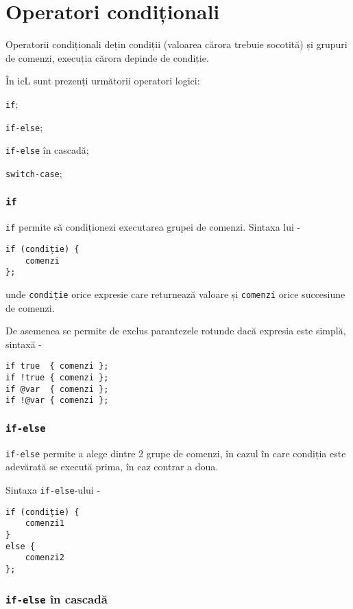 \section{Operatori condiționali}

Operatorii condiționali dețin condiții (valoarea cărora trebuie socotită) și grupuri de comenzi, execuția cărora depinde de condiție.

În icL sunt prezenți următorii operatori logici:
\begin{icItems}
	\item \texttt{if};
	\item \texttt{if-else};
	\item \texttt{if-else} în cascadă;
	\item \texttt{switch-case};
\end{icItems}

\subsubsection{\texttt{if}}

\texttt{if} permite să condiționezi executarea grupei de comenzi. Sintaxa lui -
\begin{verbatim}
if (condiție) {
	comenzi
};
\end{verbatim}
unde \texttt{condiție} orice expresie care returnează valoare \bool{} și \texttt{comenzi} orice succesiune de comenzi.

De asemenea se permite de exclus parantezele rotunde dacă expresia este simplă, sintaxă -
\begin{verbatim}
if true  { comenzi };
if !true { comenzi };
if @var  { comenzi };
if !@var { comenzi };
\end{verbatim}

\subsubsection{\texttt{if-else}}

\texttt{if-else} permite a alege dintre 2 grupe de comenzi, în cazul în care condiția este adevărată se execută prima, în caz contrar a doua.

Sintaxa \texttt{if-else}-ului -
\begin{verbatim}
if (condiție) {
	comenzi1
}
else {
	comenzi2
};
\end{verbatim}

\subsubsection{\texttt{if-else} în cascadă}

